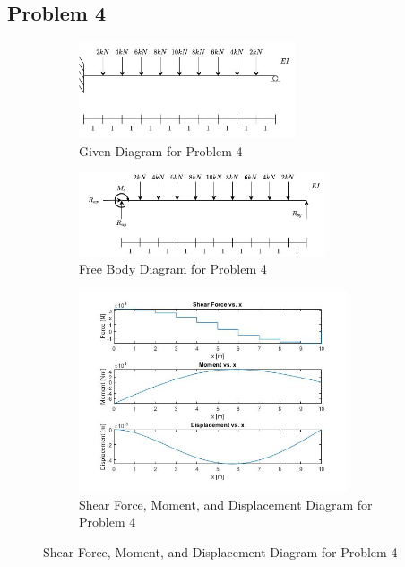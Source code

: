 \documentclass[a4paper]{article}
\begin{document}
\subsection{Problem 4}
\begin{figure}[H]
\centering
   \begin{subfigure}[b]{\textwidth}
   \centering
   \includegraphics[width=0.7\textwidth]{problems/prob_4.jpg}
   \caption{Given Diagram for Problem 4}
   \label{prob4:prob} 
\end{subfigure}
\begin{subfigure}[b]{\textwidth}
   \centering   
   \includegraphics[width=0.8\textwidth]{FBD/FBD_4.jpg}
   \caption{Free Body Diagram for Problem 4}
   \label{prob4:FBD}
\end{subfigure}
\begin{subfigure}[b]{\textwidth}
   \centering   
   \includegraphics[width=0.87\textwidth]{results/solution_4.jpg}
   \caption{Shear Force, Moment, and Displacement Diagram for Problem 4}
   \label{prob4:results}
\end{subfigure}
\label{prob4}
\end{figure}
\end{document}
